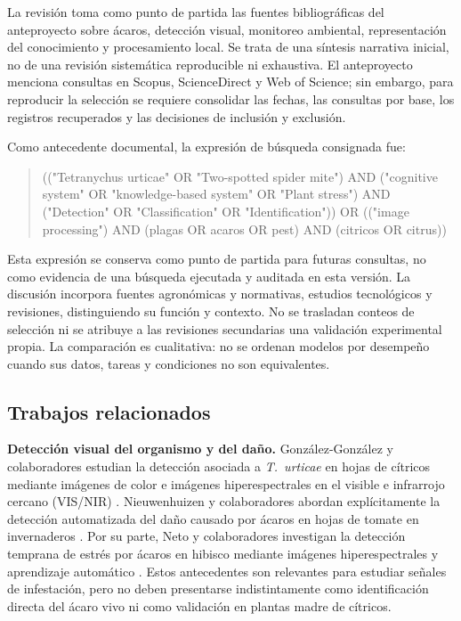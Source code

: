 La revisión toma como punto de partida las fuentes bibliográficas del
anteproyecto sobre ácaros, detección visual, monitoreo ambiental, representación
del conocimiento y procesamiento local. Se trata de una síntesis narrativa
inicial, no de una revisión sistemática reproducible ni exhaustiva. El
anteproyecto menciona consultas en Scopus, ScienceDirect y Web of Science;
sin embargo, para reproducir la selección se requiere consolidar las fechas,
las consultas por base, los registros recuperados y las decisiones de
inclusión y exclusión.

Como antecedente documental, la expresión de búsqueda consignada fue:
\begin{quote}
\small\ttfamily\raggedright
(("Tetranychus urticae" OR "Two-spotted spider mite") AND
("cognitive system" OR "knowledge-based system" OR "Plant stress") AND
("Detection" OR "Classification" OR "Identification")) OR
(("image processing") AND (plagas OR acaros OR pest) AND (citricos OR citrus))
\end{quote}
Esta expresión se conserva como punto de partida para futuras consultas, no
como evidencia de una búsqueda ejecutada y auditada en esta versión. La
discusión incorpora fuentes agronómicas y normativas, estudios tecnológicos y
revisiones, distinguiendo su función y contexto. No se trasladan conteos de
selección ni se atribuye a las revisiones secundarias una validación
experimental propia. La comparación es cualitativa: no se ordenan modelos por
desempeño cuando sus datos, tareas y condiciones no son equivalentes.

\subsection{Trabajos relacionados}
\label{subsec:trabajos-relacionados}

\textbf{Detección visual del organismo y del daño.}
González-González y colaboradores estudian la detección asociada a
\textit{T.~urticae} en hojas de cítricos mediante imágenes de color e imágenes
hiperespectrales en el visible e infrarrojo cercano (VIS/NIR)
\cite{gonzalezgonzalez2021}. Nieuwenhuizen y colaboradores abordan
explícitamente la detección automatizada del daño causado por ácaros en hojas
de tomate en invernaderos \cite{nieuwenhuizen2020}. Por su parte, Neto y
colaboradores investigan la detección temprana de estrés por ácaros en hibisco
mediante imágenes hiperespectrales y aprendizaje automático
\cite{neto2026early}. Estos antecedentes son relevantes para estudiar señales
de infestación, pero no deben presentarse indistintamente como identificación
directa del ácaro vivo ni como validación en plantas madre de cítricos.

